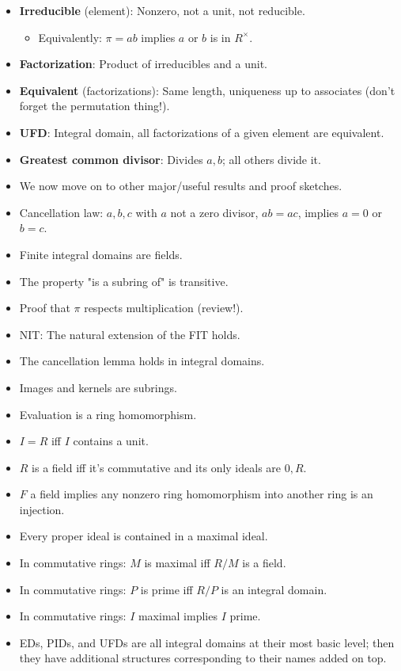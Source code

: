 \documentclass[../notes.tex]{subfiles}
\begin{document}
\begin{itemize}
    \item \textbf{Irreducible} (element): Nonzero, not a unit, not reducible.
    \begin{itemize}
        \item Equivalently: $\pi=ab$ implies $a$ or $b$ is in $R^\times$.
    \end{itemize}
    \item \textbf{Factorization}: Product of irreducibles and a unit.
    \item \textbf{Equivalent} (factorizations): Same length, uniqueness up to associates (don't forget the permutation thing!).
    \item \textbf{UFD}: Integral domain, all factorizations of a given element are equivalent.
    \item \textbf{Greatest common divisor}: Divides $a,b$; all others divide it.
    \item We now move on to other major/useful results and proof sketches.
    \item Cancellation law: $a,b,c$ with $a$ not a zero divisor, $ab=ac$, implies $a=0$ or $b=c$.
    \item Finite integral domains are fields.
    \item The property "is a subring of" is transitive.
    \item Proof that $\pi$ respects multiplication (review!).
    \item NIT: The natural extension of the FIT holds.
    \item The cancellation lemma holds in integral domains.
    \item Images and kernels are subrings.
    \item Evaluation is a ring homomorphism.
    \item $I=R$ iff $I$ contains a unit.
    \item $R$ is a field iff it's commutative and its only ideals are $0,R$.
    \item $F$ a field implies any nonzero ring homomorphism into another ring is an injection.
    \item Every proper ideal is contained in a maximal ideal.
    \item In commutative rings: $M$ is maximal iff $R/M$ is a field.
    \item In commutative rings: $P$ is prime iff $R/P$ is an integral domain.
    \item In commutative rings: $I$ maximal implies $I$ prime.
    \item EDs, PIDs, and UFDs are all integral domains at their most basic level; then they have additional structures corresponding to their names added on top.

\end{itemize}
\end{document}

